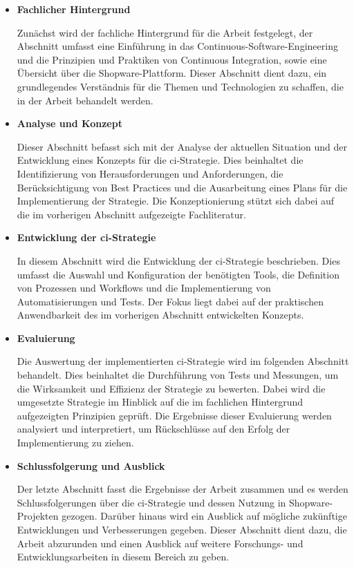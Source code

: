 \begin{itemize}
    \item {
        \textbf{Fachlicher Hintergrund}\par
        Zunächst wird der fachliche Hintergrund für die Arbeit festgelegt, der Abschnitt umfasst eine Einführung in das
        Continuous-Software-Engineering und die Prinzipien und Praktiken von Continuous Integration, sowie eine
        Übersicht über die Shopware-Plattform.
        Dieser Abschnitt dient dazu, ein grundlegendes Verständnis für die Themen und Technologien zu schaffen, die in
        der Arbeit behandelt werden.
    }

    \item {
        \textbf{Analyse und Konzept}\par
        Dieser Abschnitt befasst sich mit der Analyse der aktuellen Situation und der Entwicklung eines Konzepts für die
        \acrshort{ci}-Strategie.
        Dies beinhaltet die Identifizierung von Herausforderungen und Anforderungen, die Berücksichtigung von Best
        Practices und die Ausarbeitung eines Plans für die Implementierung der Strategie.
        Die Konzeptionierung stützt sich dabei auf die im vorherigen Abschnitt aufgezeigte Fachliteratur.
    }

    \item{
        \textbf{Entwicklung der \acrshort{ci}-Strategie}\par
        In diesem Abschnitt wird die Entwicklung der \acrshort{ci}-Strategie beschrieben.
        Dies umfasst die Auswahl und Konfiguration der benötigten Tools, die Definition von Prozessen und Workflows und
        die Implementierung von Automatisierungen und Tests.
        Der Fokus liegt dabei auf der praktischen Anwendbarkeit des im vorherigen Abschnitt entwickelten Konzepts.
    }

    \item{
        \textbf{Evaluierung}\par
        Die Auswertung der implementierten \acrshort{ci}-Strategie wird im folgenden Abschnitt behandelt.
        Dies beinhaltet die Durchführung von Tests und Messungen, um die Wirksamkeit und Effizienz der Strategie zu
        bewerten.
        Dabei wird die umgesetzte Strategie im Hinblick auf die im fachlichen Hintergrund aufgezeigten Prinzipien
        geprüft.
        Die Ergebnisse dieser Evaluierung werden analysiert und interpretiert, um Rückschlüsse auf den Erfolg der
        Implementierung zu ziehen.
    }

    \item{
        \textbf{Schlussfolgerung und Ausblick}\par
        Der letzte Abschnitt fasst die Ergebnisse der Arbeit zusammen und es werden Schlussfolgerungen über die
        \acrshort{ci}-Strategie und dessen Nutzung in Shopware-Projekten gezogen.
        Darüber hinaus wird ein Ausblick auf mögliche zukünftige Entwicklungen und Verbesserungen gegeben.
        Dieser Abschnitt dient dazu, die Arbeit abzurunden und einen Ausblick auf weitere Forschungs- und
        Entwicklungsarbeiten in diesem Bereich zu geben.
    }
\end{itemize}

\clearpage
